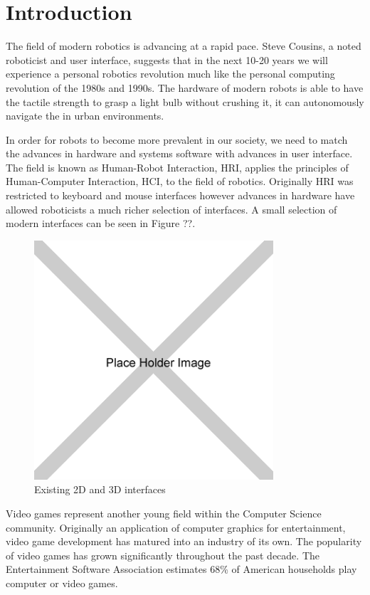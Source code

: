 \chapter{Introduction}

The field of modern robotics is advancing at a rapid pace. Steve Cousins, a noted roboticist and user interface, suggests that in the next 10-20 years we will experience a personal robotics revolution much like the personal computing revolution of the 1980s and 1990s. The hardware of modern robots is able to have the tactile strength to grasp a light bulb without crushing it, it can autonomously navigate the in urban environments.

In order for robots to become more prevalent in our society, we need to match the advances in hardware and systems software with advances in user interface. The field is known as Human-Robot Interaction, HRI, applies the principles of Human-Computer Interaction, HCI, to the field of robotics. Originally HRI was restricted to keyboard and mouse interfaces however advances in hardware have allowed roboticists a much richer selection of interfaces. A small selection of modern interfaces can be seen in Figure ??.

\begin{figure}[ht]
\begin{center}
\includegraphics[width=3.5in]{images/placeholder.png}
\caption{Existing 2D and 3D interfaces\label{fig:existing-robot-ui}}
\end{center}
\end{figure}

Video games represent another young field within the Computer Science community. Originally an application of computer graphics for entertainment, video game development has matured into an industry of its own. The popularity of video games has grown significantly throughout the past decade. The Entertainment Software Association estimates 68\% of American households play computer or video games.


